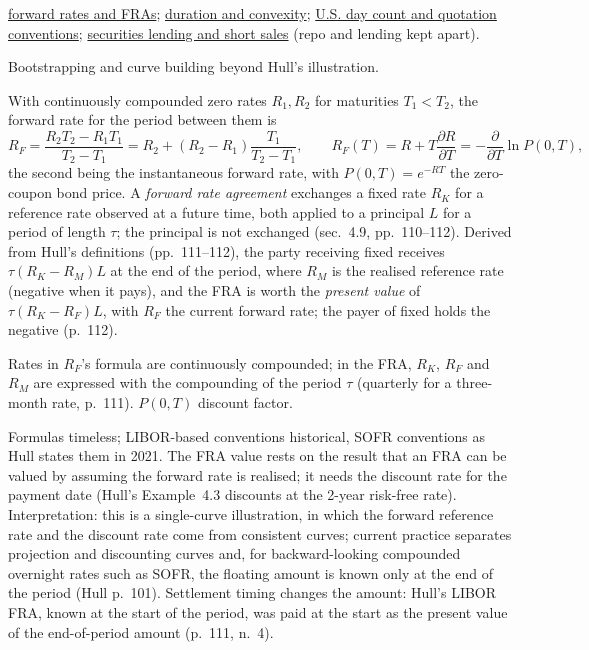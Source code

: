 \begin{qfdefinition}
 \hyperref[mod:forward-rates-fra]{forward rates and FRAs}; \hyperref[mod:duration-convexity]{duration and convexity}; \hyperref[conv:us-rate-quotation]{U.S. day count and quotation conventions}; \hyperref[mech:securities-lending-short-sale]{securities lending and short sales} (repo and lending kept apart).

 Bootstrapping and curve building beyond Hull's illustration.

\end{qfdefinition}

\begin{qfmodel}\label{mod:forward-rates-fra}
 With continuously compounded zero rates $R_1,R_2$ for maturities $T_1<T_2$, the forward rate for the period between them is \citep[chap.~4, ``Interest Rates'', sec.~4.8, pp.~109--110, eqs.~(4.5)--(4.6)]{s7-hulloptions}
\[ R_F=\frac{R_2T_2-R_1T_1}{T_2-T_1}=R_2+(R_2-R_1)\frac{T_1}{T_2-T_1},\qquad R_F(T)=R+T\frac{\partial R}{\partial T}=-\frac{\partial}{\partial T}\ln P(0,T), \]
the second being the instantaneous forward rate, with $P(0,T)=e^{-RT}$ the zero-coupon bond price. A \emph{forward rate agreement} exchanges a fixed rate $R_K$ for a reference rate observed at a future time, both applied to a principal $L$ for a period of length $\tau$; the principal is not exchanged (sec.~4.9, pp.~110--112). Derived from Hull's definitions (pp.~111--112), the party receiving fixed receives $\tau(R_K-R_M)L$ at the end of the period, where $R_M$ is the realised reference rate (negative when it pays), and the FRA is worth the \emph{present value} of $\tau(R_K-R_F)L$, with $R_F$ the current forward rate; the payer of fixed holds the negative (p.~112).

 Rates in $R_F$'s formula are continuously compounded; in the FRA, $R_K$, $R_F$ and $R_M$ are expressed with the compounding of the period $\tau$ (quarterly for a three-month rate, p.~111). $P(0,T)$ discount factor.

 Formulas timeless; LIBOR-based conventions historical, SOFR conventions as Hull states them in 2021. The FRA value rests on the result that an FRA can be valued by assuming the forward rate is realised; it needs the discount rate for the payment date (Hull's Example~4.3 discounts at the 2-year risk-free rate). Interpretation: this is a single-curve illustration, in which the forward reference rate and the discount rate come from consistent curves; current practice separates projection and discounting curves and, for backward-looking compounded overnight rates such as SOFR, the floating amount is known only at the end of the period (Hull p.~101). Settlement timing changes the amount: Hull's LIBOR FRA, known at the start of the period, was paid at the start as the present value of the end-of-period amount (p.~111, n.~4).


\end{qfmodel}
